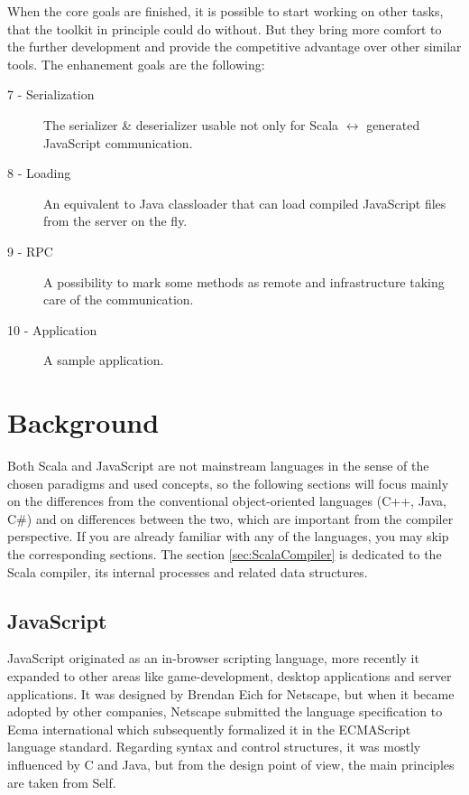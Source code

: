 \documentclass[12pt,a4paper]{report}
\begin{document}
When the core goals are finished, it is possible to start working on other tasks, that the toolkit in principle could do without. But they bring more comfort to the further development and provide the competitive advantage over other similar tools. The enhanement goals are the following:

\begin{description}
\item[7 - Serialization] The serializer \& deserializer usable not only for Scala $\leftrightarrow$ generated JavaScript communication.
\item[8 - Loading] An equivalent to Java classloader that can load compiled JavaScript files from the server on the fly.
\item[9 - RPC] A possibility to mark some methods as remote and infrastructure taking care of the communication.
\item[10 - Application] A sample application.
\end{description}



\chapter{Background}

Both Scala and JavaScript are not mainstream languages in the sense of the chosen paradigms and used concepts, so the following sections will focus mainly on the differences from the conventional object-oriented languages (C++, Java, C\#) and on differences between the two, which are important from the compiler perspective. If you are already familiar with any of the languages, you may skip the corresponding sections. The section \ref{sec:ScalaCompiler}  is dedicated to the Scala compiler, its internal processes and related data structures.

\section{JavaScript}

JavaScript\cite{JavaScript} originated as an in-browser scripting language, more recently it expanded to other areas like game-development, desktop applications and server applications. It was designed by Brendan Eich for Netscape, but when it became adopted by other companies, Netscape submitted the language specification to Ecma international which subsequently formalized it in the ECMAScript language standard\cite{EcmaScript}. Regarding syntax and control structures, it was mostly influenced by C and Java, but from the design point of view, the main principles are taken from Self\cite{Self}.
\end{document}
